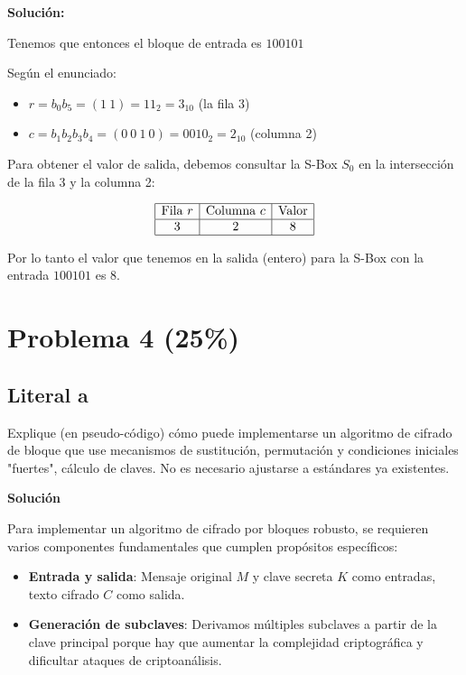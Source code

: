 {\textbf{Solución:}

Tenemos que entonces el bloque de entrada es $100101$

Según el enunciado:
\begin{itemize}
    \item $r = b_0b_5 = (1~1) = 11_2 = 3_{10}$ (la fila 3)
    \item $c = b_1b_2b_3b_4 = (0~0~1~0) = 0010_2 = 2_{10}$ (columna 2)
\end{itemize}

Para obtener el valor de salida, debemos consultar la S-Box $S_0$ en la intersección de la fila 3 y la columna 2:

$$
\begin{array}{|c|c|c|}
\hline
\text{Fila } r & \text{Columna } c & \text{Valor} \\
\hline
3 & 2 & 8 \\
\hline
\end{array}
$$

Por lo tanto el valor que tenemos en la salida (entero) para la S-Box con la entrada $100101$ es 8.


\section{Problema 4 (25\%)}



\subsection{Literal a}
Explique (en pseudo-código) cómo puede implementarse un algoritmo de cifrado de bloque que use mecanismos de sustitución, permutación y condiciones iniciales "fuertes", cálculo de claves. No es necesario ajustarse a estándares ya existentes.

\textbf{Solución}

Para implementar un algoritmo de cifrado por bloques robusto, se requieren varios componentes fundamentales que cumplen propósitos específicos:

\begin{itemize}
    \item \textbf{Entrada y salida}: Mensaje original $M$ y clave secreta $K$ como entradas, texto cifrado $C$ como salida.
    
    \item \textbf{Generación de subclaves}: Derivamos múltiples subclaves a partir de la clave principal porque hay que aumentar la complejidad criptográfica y dificultar ataques de criptoanálisis.
    

\end{itemize}}
